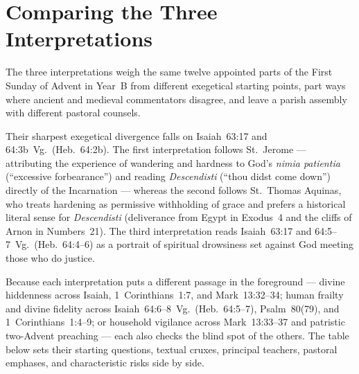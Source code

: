 \section{Comparing the Three Interpretations}

The three interpretations weigh the same twelve appointed parts of the First Sunday of Advent in Year~B from different exegetical starting points, part ways where ancient and medieval commentators disagree, and leave a parish assembly with different pastoral counsels.

Their sharpest exegetical divergence falls on Isaiah~63:17 and 64:3b~Vg.\ (Heb.~64:2b). The first interpretation follows St.~Jerome --- attributing the experience of wandering and hardness to God's \emph{nimia patientia} (``excessive forbearance'') and reading \emph{Descendisti} (``thou didst come down'') directly of the Incarnation --- whereas the second follows St.~Thomas Aquinas, who treats hardening as permissive withholding of grace and prefers a historical literal sense for \emph{Descendisti} (deliverance from Egypt in Exodus~4 and the cliffs of Arnon in Numbers~21). The third interpretation reads Isaiah~63:17 and 64:5--7~Vg.\ (Heb.~64:4--6) as a portrait of spiritual drowsiness set against God meeting those who do justice.

Because each interpretation puts a different passage in the foreground --- divine hiddenness across Isaiah, 1~Corinthians~1:7, and Mark~13:32--34; human frailty and divine fidelity across Isaiah~64:6--8~Vg.\ (Heb.~64:5--7), Psalm~80(79), and 1~Corinthians~1:4--9; or household vigilance across Mark~13:33--37 and patristic two-Advent preaching --- each also checks the blind spot of the others. The table below sets their starting questions, textual cruxes, principal teachers, pastoral emphases, and characteristic risks side by side.


